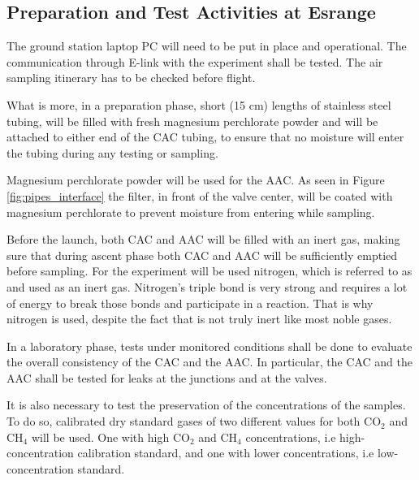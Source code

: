 \subsection{Preparation and Test Activities at Esrange}
The ground station laptop PC will need to be put in place and operational. The communication through E-link with the experiment shall be tested. The air sampling itinerary has to be checked before flight.

What is more, in a preparation phase, short (15 cm) lengths of stainless steel tubing, will be filled with fresh magnesium perchlorate powder \cite{Karion} and will be attached to either end of the CAC tubing, to ensure that no moisture will enter the tubing during any testing or sampling.

Magnesium perchlorate powder will be used for the AAC. As seen in Figure \ref{fig:pipes_interface} the filter, in front of the valve center, will be coated with magnesium perchlorate to prevent moisture from entering while sampling. 

Before the launch, both CAC and AAC will be filled with  an inert gas, making sure that during ascent phase both CAC and AAC will be sufficiently emptied before sampling.  
For the experiment will be used nitrogen, which is referred to as and used as an inert gas. Nitrogen's triple bond is very strong and requires a lot of energy to break those bonds and participate in a reaction. That is why nitrogen is used, despite the fact that is not truly inert like most noble gases. 

In a laboratory phase, tests under monitored conditions shall be done to evaluate the overall consistency of the CAC and the AAC. In particular, the CAC and the AAC shall be tested for leaks at the junctions and at the valves. 

It is also necessary to test the preservation of the concentrations of the samples. To do so, calibrated dry standard gases of two different values for both CO$_2$ and CH$_4$ will be used. One with high CO$_2$ and CH$_4$ concentrations, i.e high-concentration calibration standard, and one with lower concentrations, i.e low-concentration standard.

  
